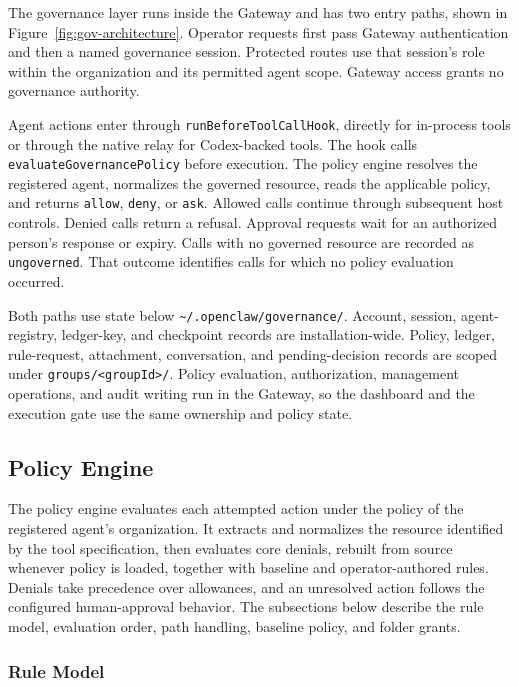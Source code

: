 {\color{red}The governance layer runs inside the Gateway and has two entry paths, shown
in Figure~\ref{fig:gov-architecture}. Operator requests first pass Gateway
authentication and then a named governance session. Protected routes use that
session's role within the organization and its permitted agent scope. Gateway access grants
no governance authority.

Agent actions enter through \texttt{runBeforeToolCallHook}, directly for
in-process tools or through the native relay for Codex-backed tools. The hook
calls \texttt{evaluateGovernancePolicy} before execution. The policy engine
resolves the registered agent, normalizes the governed resource, reads the
applicable policy, and returns \texttt{allow}, \texttt{deny}, or \texttt{ask}.
Allowed calls continue through subsequent host controls. Denied calls
return a refusal. Approval requests wait for an authorized person's response
or expiry. Calls with no governed resource are recorded as \texttt{ungoverned}.
That outcome identifies calls for which no policy evaluation occurred.

Both paths use state below
\texttt{\textasciitilde/.openclaw/governance/}. Account, session, agent-registry,
ledger-key, and checkpoint records are installation-wide. Policy, ledger,
rule-request, attachment, conversation, and pending-decision records are scoped
under \texttt{groups/<groupId>/}. Policy evaluation, authorization, management
operations, and audit writing run in the Gateway, so the dashboard and the
execution gate use the same ownership and policy state.}

\FloatBarrier

\subsection{Policy Engine}
\label{sec:gov-gate}
{\color{red}The policy engine evaluates each attempted action under the policy of
the registered agent's organization. It extracts and normalizes the resource
identified by the tool specification, then evaluates core denials,
rebuilt from source whenever policy is loaded, together with baseline and
operator-authored rules. Denials take precedence over allowances, and an
unresolved action follows the configured human-approval behavior. The
subsections below describe the rule model, evaluation order, path handling,
baseline policy, and folder grants.}

\subsubsection{Rule Model}

